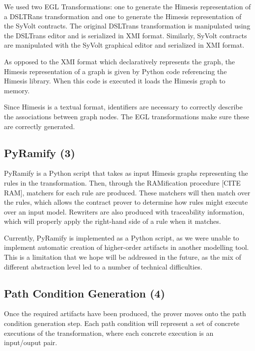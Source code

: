 We used two EGL Transformations: one to generate the Himesis representation of a DSLTRans transformation and one to generate the Himesis representation of the SyVolt contracts. The original DSLTrans transformation is manipulated using the DSLTrans editor and is serialized in XMI format. Similarly, SyVolt contracts are manipulated with the SyVolt graphical editor and serialized in XMI format.

As opposed to the XMI format which declaratively represents the graph, the Himesis representation of a graph is given by Python code referencing the Himesis library. When this code is executed it loads the Himesis graph to memory.

Since Himesis is a textual format, identifiers are necessary to correctly describe the associations between graph nodes. The EGL transformations make sure these are correctly generated.


\subsection{PyRamify (3)}

PyRamify is a Python script that takes as input Himesis graphs representing the rules in the transformation. Then, through the RAMification procedure [CITE RAM], matchers for each rule are produced. These matchers will then match over the rules, which allows the contract prover to determine how rules might execute over an input model. Rewriters are also produced with traceability information, which will properly apply the right-hand side of a rule when it matches.

Currently, PyRamify is implemented as a Python script, as we were unable to implement automatic creation of higher-order artifacts in another modelling tool. This is a limitation that we hope will be addressed in the future, as the mix of different abstraction level led to a number of technical difficulties.

\subsection{Path Condition Generation (4)}

Once the required artifacts have been produced, the prover moves onto the path condition generation step.  Each
path condition will represent a set of concrete executions
of the transformation, where each concrete execution is an
input/ouput pair.

